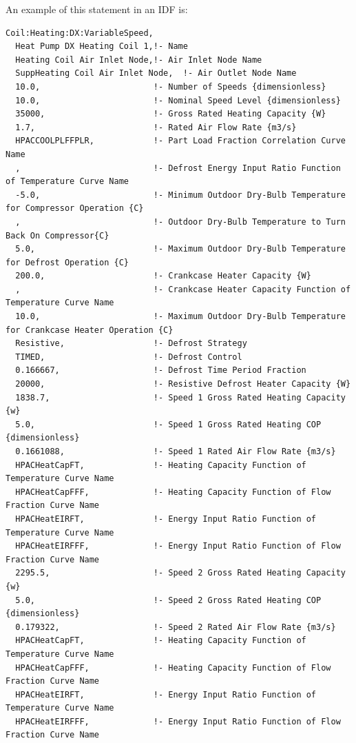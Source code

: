 An example of this statement in an IDF is:

\begin{lstlisting}
Coil:Heating:DX:VariableSpeed,
  Heat Pump DX Heating Coil 1,!- Name
  Heating Coil Air Inlet Node,!- Air Inlet Node Name
  SuppHeating Coil Air Inlet Node,  !- Air Outlet Node Name
  10.0,                       !- Number of Speeds {dimensionless}
  10.0,                       !- Nominal Speed Level {dimensionless}
  35000,                      !- Gross Rated Heating Capacity {W}
  1.7,                        !- Rated Air Flow Rate {m3/s}
  HPACCOOLPLFFPLR,            !- Part Load Fraction Correlation Curve Name
  ,                           !- Defrost Energy Input Ratio Function of Temperature Curve Name
  -5.0,                       !- Minimum Outdoor Dry-Bulb Temperature for Compressor Operation {C}
  ,                           !- Outdoor Dry-Bulb Temperature to Turn Back On Compressor{C}
  5.0,                        !- Maximum Outdoor Dry-Bulb Temperature for Defrost Operation {C}
  200.0,                      !- Crankcase Heater Capacity {W}
  ,                           !- Crankcase Heater Capacity Function of Temperature Curve Name
  10.0,                       !- Maximum Outdoor Dry-Bulb Temperature for Crankcase Heater Operation {C}
  Resistive,                  !- Defrost Strategy
  TIMED,                      !- Defrost Control
  0.166667,                   !- Defrost Time Period Fraction
  20000,                      !- Resistive Defrost Heater Capacity {W}
  1838.7,                     !- Speed 1 Gross Rated Heating Capacity {w}
  5.0,                        !- Speed 1 Gross Rated Heating COP {dimensionless}
  0.1661088,                  !- Speed 1 Rated Air Flow Rate {m3/s}
  HPACHeatCapFT,              !- Heating Capacity Function of Temperature Curve Name
  HPACHeatCapFFF,             !- Heating Capacity Function of Flow Fraction Curve Name
  HPACHeatEIRFT,              !- Energy Input Ratio Function of Temperature Curve Name
  HPACHeatEIRFFF,             !- Energy Input Ratio Function of Flow Fraction Curve Name
  2295.5,                     !- Speed 2 Gross Rated Heating Capacity {w}
  5.0,                        !- Speed 2 Gross Rated Heating COP {dimensionless}
  0.179322,                   !- Speed 2 Rated Air Flow Rate {m3/s}
  HPACHeatCapFT,              !- Heating Capacity Function of Temperature Curve Name
  HPACHeatCapFFF,             !- Heating Capacity Function of Flow Fraction Curve Name
  HPACHeatEIRFT,              !- Energy Input Ratio Function of Temperature Curve Name
  HPACHeatEIRFFF,             !- Energy Input Ratio Function of Flow Fraction Curve Name

\end{lstlisting}
